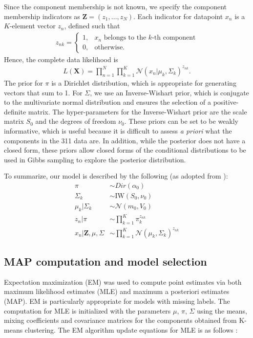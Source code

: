 \documentclass[twoside]{article}
\newcommand{\N}{\mathcal{N}}
\theoremstyle{theorem}
\theoremstyle{theorem}
\theoremstyle{theorem}
\theoremstyle{lemma}
\theoremstyle{definition}
\theoremstyle{example}
\begin{document}
Since the component membership is not known, we specify the component membership indicators as $\mathbf{Z} = (z_1, \ldots, z_N)$. Each indicator for datapoint $x_n$ is a $K$-element vector $z_n$, defined such that \begin{align}
z_{nk} = \begin{cases}
1, & x_n\text{ belongs to the $k$-th component}\\
0, & \text{otherwise}. 
\end{cases}
\end{align}
Hence, the complete data likelihood is 
\begin{align}
L(\mathbf{X}) = \prod_{n=1}^N\prod_{k=1}^K \N(x_n| \mu_k, \Sigma_k)^{z_{nk}}.
\end{align}
The prior for $\pi$ is a Dirichlet distribution, which is appropriate for generating vectors that sum to 1. For $\Sigma$, we use an Inverse-Wishart prior, which is conjugate to the multivariate normal distribution and ensures the selection of a positive-definite matrix. The hyper-parameters for the Inverse-Wishart prior are the scale matrix $S_0$ and the degrees of freedom $\nu_0$.  These priors can be set to be weakly informative, which is useful because it is difficult to assess \textit{a priori} what the components in the 311 data are. In addition, while the posterior does not have a closed form, these priors allow closed forms of the conditional distributions to be used in Gibbs sampling to explore the posterior distribution. 

To summarize, our model is described by the following (as adopted from \cite{Gelman, Jones}): 
\begin{align}
\pi &\sim Dir(\alpha_0)\\
\Sigma_k &\sim \mathrm{IW}(S_0, \nu_0)\\
\mu_k | \Sigma_k &\sim \N(m_0, V_0)\\
z_n | \pi &\sim \prod_{k=1}^K \pi_k^{z_{nk}}\\
x_n | \mathbf{Z}, \mu, \Sigma &\sim \prod_{k=1}^K \N(\mu_k, \Sigma_k)^{z_{nk}}
\end{align}

\subsection{MAP computation and model selection}
Expectation maximization (EM) was used to compute point estimates via both maximum likelihood estimates (MLE) and maximum a posteriori estimates (MAP). EM is particularly appropriate for models with missing labels. The computation for MLE is initialized with the parameters $\mu$, $\pi$, $\Sigma$ using the means, mixing coefficients and covariance matrices for the components obtained from K-means clustering. The EM algorithm update equations for MLE is as follows \cite{Bishop}: 
\end{document}
